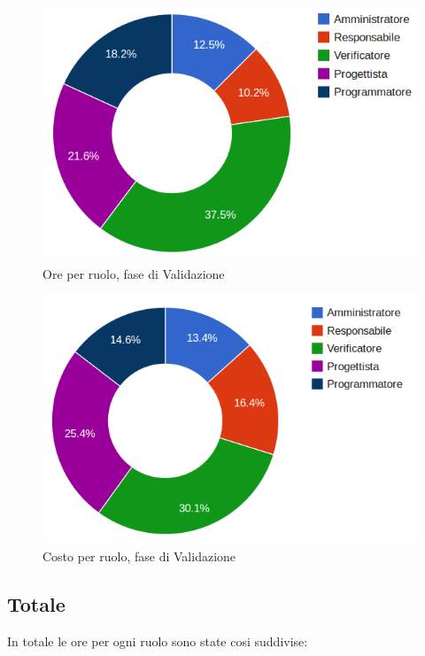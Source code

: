 \begin{figure}[H]
\centering
\includegraphics[scale=0.35]{5-4-1.png}
\caption{Ore per ruolo, fase di Validazione\label{fig:nome}}
\end{figure}

\begin{figure}[H]
\centering
\includegraphics[scale=0.35]{5-4-2.png}
\caption{Costo per ruolo, fase di Validazione\label{fig:nome}}
\end{figure}

\subsection{Totale}

In totale le ore per ogni ruolo sono state cosi suddivise:


